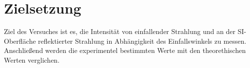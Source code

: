 \section{Zielsetzung}
\label{sec:zielsetzung}

Ziel des Versuches ist es, die Intensität von einfallender Strahlung und an der SI-Oberfläche reflektierter Strahlung 
in Abhängigkeit des Einfallswinkels zu messen. Anschließend werden die experimentel bestimmten Werte mit den theorethischen Werten 
verglichen.